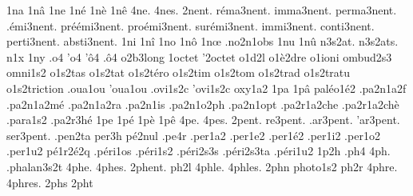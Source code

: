 {%
1na
1nâ
1ne
1né
1nè
1nê
4ne.
4nes.
      2nent. %
  réma3nent.
  imma3nent.
 perma3nent.
  .émi3nent.
préémi3nent.
proémi3nent.
surémi3nent.
  immi3nent.
 conti3nent.
 perti3nent.
 absti3nent.
%
1ni
1nî
1no
1nô
1nœ
                    .no2n1obs
1nu
1nû
                    n3s2at.
                    n3s2ats.
n1x
1ny
.o4
'o4
'ô4
.ô4
                    o2b3long
                    1octet %
                    '2octet
                    o1d2l
                    o1è2dre
                    o1ioni
                    ombud2s3
                    omni1s2
                    o1s2tas
                    o1s2tat
                    o1s2téro
                    o1s2tim
                    o1s2tom
                    o1s2trad
                    o1s2tratu
                    o1s2triction
                    .oua1ou
                    'oua1ou
                    .ovi1s2c
                    'ovi1s2c
                    oxy1a2
1pa
1pâ
                    paléo1é2
                    .pa2n1a2f
                    .pa2n1a2mé
                    .pa2n1a2ra
                    .pa2n1is
                    .pa2n1o2ph
                    .pa2n1opt
                    .pa2r1a2che
                    .pa2r1a2chè
                    .para1s2
                    .pa2r3hé
1pe
1pé
1pè
1pê
4pe.
4pes.
   2pent.
 re3pent.
.ar3pent.
'ar3pent.
ser3pent.
%
                    .pen2ta %
                    per3h
                    pé2nul %
                    .pe4r
                    .per1a2
                    .per1e2
                    .per1é2
                    .per1i2
                    .per1o2
                    .per1u2
                    pé1r2é2q %
                    .péri1os
                    .péri1s2
                    .péri2s3s
                    .péri2s3ta
                    .péri1u2
1p2h
.ph4
4ph.
                    .phalan3s2t
4phe.
4phes.
2phent. %
ph2l
4phle.
4phles.
2phn
                    photo1s2
ph2r
4phre.
4phres.
2phs
2pht
}
